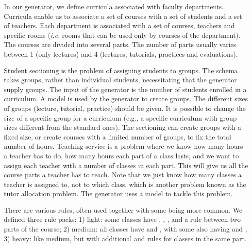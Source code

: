 \documentclass[runningheads]{llncs}
\begin{document}
 












In our generator, we define curricula associated with faculty departments.
Curricula enable us to associate a set of courses with a set of students and a set of teachers.
Each department is associated with a set of courses, teachers and specific rooms (\emph{i.e.} rooms that can be used only by courses of the department).
The courses are divided into several parts.
The number of parts usually varies between 1 (only lectures) and 4 (lectures, tutorials, practices and evaluations).







Student sectioning is the problem of assigning students to groups.
The \UTP{} schema takes groups, rather than individual students, necessitating that the generator supply groups.
The input of the generator is the number of students enrolled in a curriculum.
A \CSP{} model is used by the generator to create groups.
The different sizes of groups (lecture, tutorial, practice) should be given.
It is possible to change the size of a specific group for a curriculum (e.g., a specific curriculum with group sizes different from the standard ones).
The sectioning \CSP{} can create groups with a fixed size, or create courses with a limited number of groups, to fix the total number of hours. 
Teaching service is a problem where we know how many hours a teacher has to do, how many hours each part of a class lasts, and we want to assign each teacher with a number of classes in each part.
This will give us all the course parts a teacher has to teach. Note that we just know how many classes a teacher is assigned to, not to which class, which is another problem
known as the tutor allocation problem.
The generator uses a \CSP{} model to tackle this problem.




There are various rules, often used together with some being more common. We defined three rule packs: 1) light: some classes have \texttt{\SAMEROOMS{}}, \texttt{\SAMETEACHERS{}}, \texttt{\PERIODIC{}}, and a \texttt{\SEQUENCED{}} rule between two parts of the course; 2) medium: all classes have \texttt{\SAMEROOMS{}} and \texttt{\SAMETEACHERS{}}, with some also having \texttt{\PERIODIC{}} and \texttt{\SEQUENCED{}}; 3) heavy: like medium, but with additional \texttt{\SAMETEACHERS{}} and \texttt{\SAMESLOT{}} rules for classes in the same part.
\end{document}
